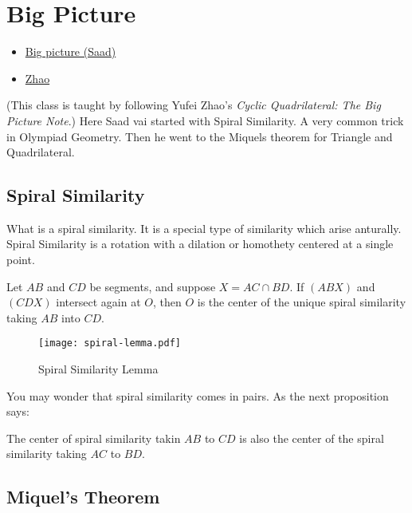 \chapter{Big Picture}%

\begin{linkb}
   \begin{itemize}
        \item \href{https://www.youtube.com/watch?v=7x3lxFRwi6Y}{Big picture (Saad)}
        \item \href{https://drive.google.com/file/d/1g92Ymk1uX2tE9Xu4hYwaIncj5K_g3kYR/view}{Zhao}
   \end{itemize}
\end{linkb}

(This class is taught by following Yufei Zhao's \textit{Cyclic Quadrilateral: The Big Picture Note}.)
Here Saad vai started with Spiral Similarity. A very common trick in Olympiad Geometry. Then  he went to the Miquels theorem for Triangle and Quadrilateral.




\section{Spiral Similarity}
What is a spiral similarity. It is a special type of similarity which arise anturally. Spiral Similarity is a rotation with a dilation or homothety centered at a single point. 

\begin{lemma}
Let $AB$ and $CD$ be segments, and suppose $X = AC \cap BD$. If $(ABX)$ and $(CDX)$ intersect again at $O$, then $O$ is the center of the unique spiral
similarity taking $AB$ into $CD$.
\end{lemma}


\begin{figure}[ht]
\centering
	\texttt{[image: spiral-lemma.pdf]}
	\caption{Spiral Similarity Lemma}
\end{figure}

You may wonder that spiral similarity comes in pairs. As the next proposition says:
\begin{proposition}
The center of spiral similarity takin $AB$ to $CD$ is also the center of the spiral similarity taking $AC$ to $BD$.
\end{proposition}


\section{Miquel's Theorem}


